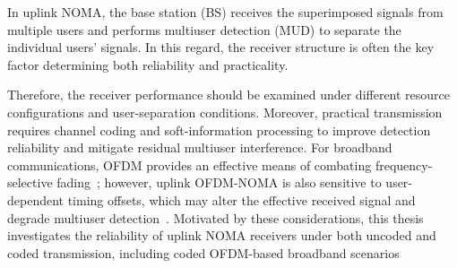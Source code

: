 In uplink NOMA, the base station (BS) receives the superimposed signals from multiple users and performs multiuser detection (MUD) to separate the individual users’ signals. In this regard, the receiver structure is often the key factor determining both reliability and practicality.

Therefore, the receiver performance should be examined under different resource configurations and user-separation conditions. Moreover, practical transmission requires channel coding and soft-information processing to improve detection reliability and mitigate residual multiuser interference. 
For broadband communications, OFDM provides an effective means of combating frequency-selective fading~\cite{hwang2009ofdm}; however, uplink OFDM-NOMA is also sensitive to user-dependent timing offsets, which may alter the effective received signal and degrade multiuser detection~\cite{haci2017performance,abeywickrama2017over}. 
Motivated by these considerations, this thesis investigates the reliability of uplink NOMA receivers under both uncoded and coded transmission, including coded OFDM-based broadband scenarios

